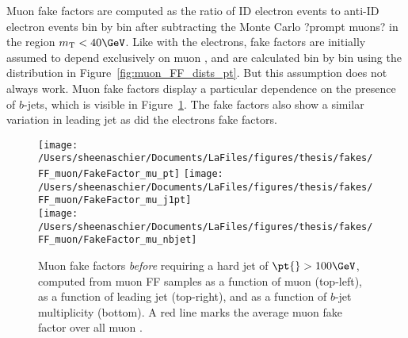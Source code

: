 \iffalse
\begin{figure}[tbp]
  \centering
  \texttt{[image: /Users/sheenaschier/Documents/LaFiles/figures/thesis/fakes/FF\_muon/IDb1\_SR\_IDmuPt]}
  \texttt{[image: /Users/sheenaschier/Documents/LaFiles/figures/thesis/fakes/FF\_muon/AIDb1\_SR\_AntiIDmuPt]}
  \caption{Muon \pt{} for numerator (left) and denominator (right) objects in the prescaled single-muon trigger sample for events with $\mathrm{m_T}< 40\GeV$.  MC has been scaled to the data in the $\mathrm{m_T} > 100\GeV$ region. Distributions from~\cite{Boerner:2231917}.}
  \label{fig:muon_FF_dists_pt_b1}
\end{figure}
\fi
Muon fake factors are computed as the ratio of ID electron events to anti-ID electron events bin by bin after subtracting the Monte Carlo ?prompt muons? in the region $m_{\mathrm{T}}<40\GeV$.  Like with the electrons, fake factors are initially assumed to depend exclusively on muon \pt, and are calculated bin by bin using the distribution in Figure~\ref{fig:muon_FF_dists_pt}.  But this assumption does not always work.  Muon fake factors display a particular dependence on the presence of $b$-jets, which is visible in Figure~\ref{fig:muon_FF_hist_noCut}.  The fake factors also show a similar variation in leading jet \pt as did the electrons fake factors.  \begin{figure}[tbp]
  \centering
  \texttt{[image: /Users/sheenaschier/Documents/LaFiles/figures/thesis/fakes/FF\_muon/FakeFactor\_mu\_pt]}
  \texttt{[image: /Users/sheenaschier/Documents/LaFiles/figures/thesis/fakes/FF\_muon/FakeFactor\_mu\_j1pt]}\\
  \texttt{[image: /Users/sheenaschier/Documents/LaFiles/figures/thesis/fakes/FF\_muon/FakeFactor\_mu\_nbjet]}\\
  \caption{Muon fake factors \textit{before} requiring a hard jet of $\pt{}> 100\GeV$, computed from muon FF samples as a function of muon \pt{} (top-left), as a function of leading jet \pt{} (top-right), and as a function of $b$-jet multiplicity (bottom). A red line marks the average muon fake factor over all muon \pt{}.}
  \label{fig:muon_FF_hist_noCut}
\end{figure}


